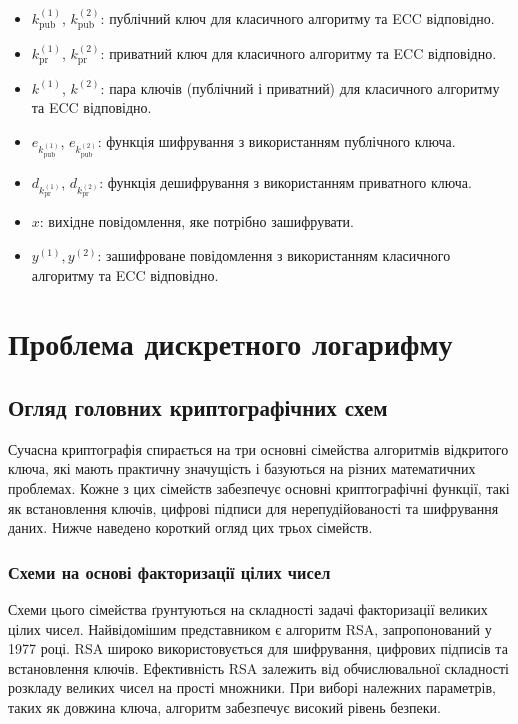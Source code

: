 \documentclass[12pt]{report}
\theoremstyle{definition}
\theoremstyle{plain}
\begin{document}
\begin{itemize}
    \item \( k_{\text{pub}}^{(1)} \), \( k_{\text{pub}}^{(2)} \): публічний ключ для класичного алгоритму та ECC відповідно.
    \item \( k_{\text{pr}}^{(1)} \), \( k_{\text{pr}}^{(2)} \): приватний ключ для класичного алгоритму та ECC відповідно.
    \item \( k^{(1)} \), \( k^{(2)} \): пара ключів (публічний і приватний) для класичного алгоритму та ECC відповідно.
    \item \( e_{k_{\text{pub}}^{(1)}} \), \( e_{k_{\text{pub}}^{(2)}} \): функція шифрування з використанням публічного ключа.
    \item \( d_{k_{\text{pr}}^{(1)}} \), \( d_{k_{\text{pr}}^{(2)}} \): функція дешифрування з використанням приватного ключа.
    \item \( x \): вихідне повідомлення, яке потрібно зашифрувати.
    \item \( y^{(1)}, y^{(2)} \): зашифроване повідомлення з використанням класичного алгоритму та ECC відповідно.
\end{itemize}

\chapter{Проблема дискретного логарифму}

\section{Огляд головних криптографічних схем}

Сучасна криптографія спирається на три основні сімейства алгоритмів відкритого ключа, які мають практичну значущість і базуються на різних математичних проблемах. Кожне з цих сімейств забезпечує основні криптографічні функції, такі як встановлення ключів, цифрові підписи для нерепудійованості та шифрування даних. Нижче наведено короткий огляд цих трьох сімейств.

\subsection{Схеми на основі факторизації цілих чисел}

Схеми цього сімейства ґрунтуються на складності задачі факторизації великих цілих чисел. Найвідомішим представником є алгоритм RSA, запропонований у 1977 році. RSA широко використовується для шифрування, цифрових підписів та встановлення ключів. Ефективність RSA залежить від обчислювальної складності розкладу великих чисел на прості множники. При виборі належних параметрів, таких як довжина ключа, алгоритм забезпечує високий рівень безпеки.
\end{document}
